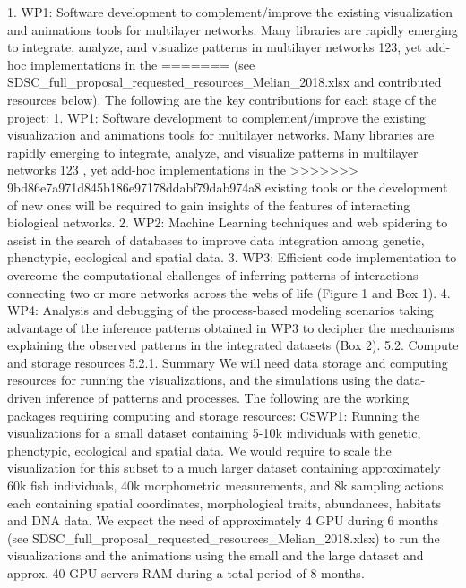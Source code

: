 \documentclass[12pt]{article}
\begin{document}
\begin{center}
1. WP1: Software development to complement/improve the existing visualization and
animations tools for multilayer networks. Many libraries are rapidly emerging to integrate,
analyze, and visualize patterns in multilayer networks 123, yet add-hoc implementations in the
=======
(see
SDSC_full_proposal_requested_resources_Melian_2018.xlsx and contributed resources
below). The following are the key contributions for each stage of the project:
1. WP1: Software development to complement/improve the existing visualization and
animations tools for multilayer networks. Many libraries are rapidly emerging to integrate,
analyze, and visualize patterns in multilayer networks 123 , yet add-hoc implementations in the
>>>>>>> 9bd86e7a971d845b186e97178ddabf79dab974a8
existing tools or the development of new ones will be required to gain insights of the features
of interacting biological networks.
2. WP2: Machine Learning techniques and web spidering to assist in the search of databases to
improve data integration among genetic, phenotypic, ecological and spatial data.
3. WP3: Efficient code implementation to overcome the computational challenges of inferring
patterns of interactions connecting two or more networks across the webs of life (Figure 1 and
Box 1).
4. WP4: Analysis and debugging of the process-based modeling scenarios taking advantage of
the inference patterns obtained in WP3 to decipher the mechanisms explaining the observed
patterns in the integrated datasets (Box 2).
5.2. Compute and storage resources
5.2.1. Summary
We will need data storage and computing resources for running the visualizations, and the
simulations using the data-driven inference of patterns and processes. The following are the
working packages requiring computing and storage resources:
CSWP1: Running the visualizations for a small dataset containing 5-10k individuals with
genetic, phenotypic, ecological and spatial data. We would require to scale the visualization for
this subset to a much larger dataset containing approximately 60k fish individuals, 40k
morphometric measurements, and 8k sampling actions each containing spatial coordinates,
morphological traits, abundances, habitats and DNA data. We expect the need of
approximately
4
GPU
during
6
months
(see
SDSC_full_proposal_requested_resources_Melian_2018.xlsx) to run the visualizations and the
animations using the small and the large dataset and approx. 40 GPU servers RAM during a
total period of 8 months.




\end{center}
\end{document}
